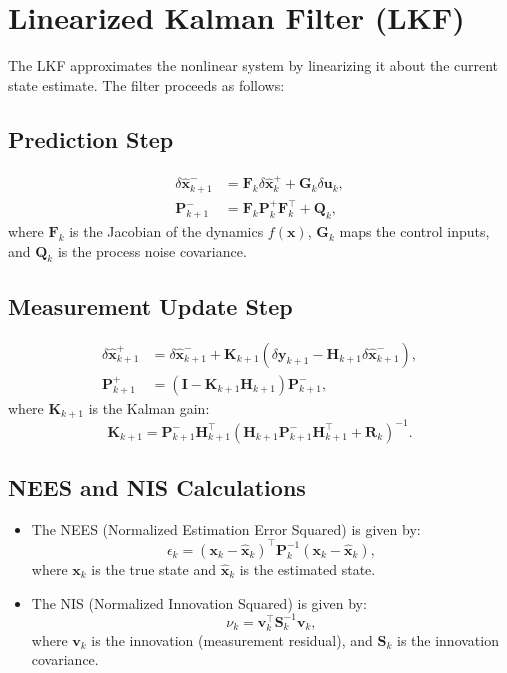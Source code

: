 \documentclass{article}
\begin{document}
\section*{Linearized Kalman Filter (LKF)}

The LKF approximates the nonlinear system by linearizing it about the current state estimate. The filter proceeds as follows:

\subsection*{Prediction Step}

\begin{align}
\delta \hat{\mathbf{x}}_{k+1}^- &= \mathbf{F}_k \delta \hat{\mathbf{x}}_k^+ + \mathbf{G}_k \delta \mathbf{u}_k, \\
\mathbf{P}_{k+1}^- &= \mathbf{F}_k \mathbf{P}_k^+ \mathbf{F}_k^\top + \mathbf{Q}_k,
\end{align}
where $\mathbf{F}_k$ is the Jacobian of the dynamics $f(\mathbf{x})$, $\mathbf{G}_k$ maps the control inputs, and $\mathbf{Q}_k$ is the process noise covariance.

\subsection*{Measurement Update Step}

\begin{align}
\delta \hat{\mathbf{x}}_{k+1}^+ &= \delta \hat{\mathbf{x}}_{k+1}^- + \mathbf{K}_{k+1} \left(\delta \mathbf{y}_{k+1} - \mathbf{H}_{k+1} \delta \hat{\mathbf{x}}_{k+1}^-\right), \\
\mathbf{P}_{k+1}^+ &= \left(\mathbf{I} - \mathbf{K}_{k+1} \mathbf{H}_{k+1}\right) \mathbf{P}_{k+1}^-,
\end{align}
where $\mathbf{K}_{k+1}$ is the Kalman gain:
\[
\mathbf{K}_{k+1} = \mathbf{P}_{k+1}^- \mathbf{H}_{k+1}^\top \left(\mathbf{H}_{k+1} \mathbf{P}_{k+1}^- \mathbf{H}_{k+1}^\top + \mathbf{R}_k\right)^{-1}.
\]

\subsection*{NEES and NIS Calculations}

\begin{itemize}
    \item The NEES (Normalized Estimation Error Squared) is given by:
    \[
    \epsilon_k = (\mathbf{x}_k - \hat{\mathbf{x}}_k)^\top \mathbf{P}_k^{-1} (\mathbf{x}_k - \hat{\mathbf{x}}_k),
    \]
    where $\mathbf{x}_k$ is the true state and $\hat{\mathbf{x}}_k$ is the estimated state.
    \item The NIS (Normalized Innovation Squared) is given by:
    \[
    \nu_k = \mathbf{v}_k^\top \mathbf{S}_k^{-1} \mathbf{v}_k,
    \]
    where $\mathbf{v}_k$ is the innovation (measurement residual), and $\mathbf{S}_k$ is the innovation covariance.
\end{itemize}
\end{document}
